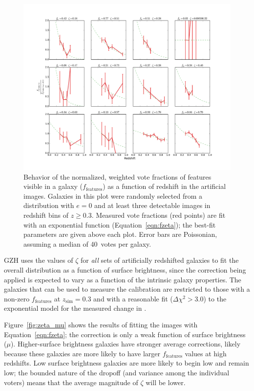 \documentclass[twocolumn]{aastex6}
\begin{document}
\begin{figure}
\center
\includegraphics[width=\textwidth]{figures/zeta_examples.pdf}
\caption{Behavior of the normalized, weighted vote fractions of features visible in a galaxy ($f_\textrm{features}$) as a function of redshift in the artificial \ferengi{} images. Galaxies in this plot were randomly selected from a distribution with $e=0$ and at least three detectable images in redshift bins of $z\ge0.3$. Measured vote fractions (red points) are fit with an exponential function (Equation~\ref{eqn:fzeta}); the best-fit parameters are given above each plot. Error bars are Poissonian, assuming a median of 40~votes per galaxy.}
\label{fig:zeta_examples}
\end{figure}

GZH uses the values of $\zeta$ for \emph{all} sets of artificially redshifted galaxies to fit the overall distribution as a function of surface brightness, since the correction being applied is expected to vary as a function of the intrinsic galaxy properties. The galaxies that can be used to measure the calibration are restricted to those with a non-zero $f_\textrm{features}$ at $z_\mathrm{sim}=0.3$ and with a reasonable fit ($\Delta \chi^2 > 3.0$) to the exponential model for the measured change in \ffeatures. 

Figure~\ref{fig:zeta_mu} shows the results of fitting the \ferengi{} images with Equation~\ref{eqn:fzeta}; the correction is only a weak function of surface brightness ($\mu$). Higher-surface brightness galaxies have stronger average corrections, likely because these galaxies are more likely to have larger $f_\textrm{features}$ values at high redshifts. Low surface brightness galaxies are more likely to begin low and remain low; the bounded nature of the dropoff (and variance among the individual voters) means that the average magnitude of $\zeta$ will be lower. 
\end{document}

